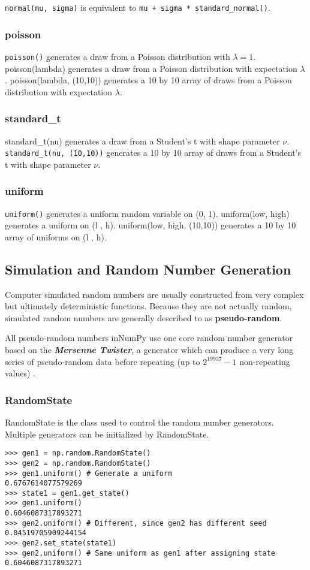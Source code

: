 \documentclass[KSmain.tex]{subfiles}
\begin{document}
\texttt{normal(mu, sigma)} is equivalent to \texttt{mu + sigma * standard_normal()}.
\subsubsection{poisson}
\texttt{poisson()} generates a draw from a Poisson distribution with $\lambda = 1$. poisson(lambda) generates a draw
from a Poisson distribution with expectation $\lambda$. poisson(lambda, (10,10)) generates a 10 by 10 array of
draws from a Poisson distribution with expectation $\lambda$.
\subsubsection{standard\_t}
standard\_t(nu) generates a draw from a Student’s t with shape parameter $\nu$. \texttt{standard_t(nu, (10,10))}
generates a 10 by 10 array of draws from a Student’s t with shape parameter $\nu$.
\subsubsection{uniform}
\texttt{uniform()} generates a uniform random variable on (0, 1). uniform(low, high) generates a uniform on
(l , h). uniform(low, high, (10,10)) generates a 10 by 10 array of uniforms on (l , h).
\newpage

\subsection{Simulation and Random Number Generation}
Computer simulated random numbers are usually constructed from very complex but ultimately deterministic
functions. Because they are not actually random, simulated random numbers are generally described
to as \textbf{pseudo-random}. 

All pseudo-random numbers inNumPy use one core random number generator
based on the \textbf{\textit{Mersenne Twister}}, a generator which can produce a very long series of pseudo-random
data before repeating (up to $2^19937 - 1$ non-repeating values)
.
\subsubsection{RandomState}
RandomState is the class used to control the random number generators. Multiple generators can be initialized
by RandomState.
\begin{framed}
\begin{verbatim}
>>> gen1 = np.random.RandomState()
>>> gen2 = np.random.RandomState()
>>> gen1.uniform() # Generate a uniform
0.6767614077579269
>>> state1 = gen1.get_state()
>>> gen1.uniform()
0.6046087317893271
>>> gen2.uniform() # Different, since gen2 has different seed
0.04519705909244154
>>> gen2.set_state(state1)
>>> gen2.uniform() # Same uniform as gen1 after assigning state
0.6046087317893271
\end{verbatim}
\end{framed}
\end{document}
